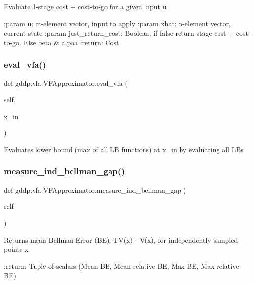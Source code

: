 \begin{DoxyVerb}Evaluate 1-stage cost + cost-to-go for a given input u

:param u: m-element vector, input to apply
:param xhat: n-element vector, current state
:param just_return_cost: Boolean, if false return stage cost + cost-to-go. Else beta & alpha
:return: Cost
\end{DoxyVerb}
 \mbox{\label{classgddp_1_1vfa_1_1_v_f_approximator_a9dadd3236516d9054fba6eff668a11fd}} 
\subsubsection{\texorpdfstring{eval\_vfa()}{eval\_vfa()}}
{\footnotesize\ttfamily def gddp.\+vfa.\+V\+F\+Approximator.\+eval\+\_\+vfa (\begin{DoxyParamCaption}\item[{}]{self,  }\item[{}]{x\+\_\+in }\end{DoxyParamCaption})}

\begin{DoxyVerb}Evaluates lower bound (max of all LB functions) at x_in by evaluating all LBs\end{DoxyVerb}
 \mbox{\label{classgddp_1_1vfa_1_1_v_f_approximator_a94eff4146cf2136eee4ee81fcf44bdd3}} 
\subsubsection{\texorpdfstring{measure\_ind\_bellman\_gap()}{measure\_ind\_bellman\_gap()}}
{\footnotesize\ttfamily def gddp.\+vfa.\+V\+F\+Approximator.\+measure\+\_\+ind\+\_\+bellman\+\_\+gap (\begin{DoxyParamCaption}\item[{}]{self }\end{DoxyParamCaption})}

\begin{DoxyVerb}Returns mean Bellman Error (BE), TV(x) - V(x), for independently sampled points x

:return: Tuple of scalars (Mean BE, Mean relative BE, Max BE, Max relative BE)
\end{DoxyVerb}
 \mbox{\label{classgddp_1_1vfa_1_1_v_f_approximator_aa89311e9d746f68aa2a788111434825c}} 
